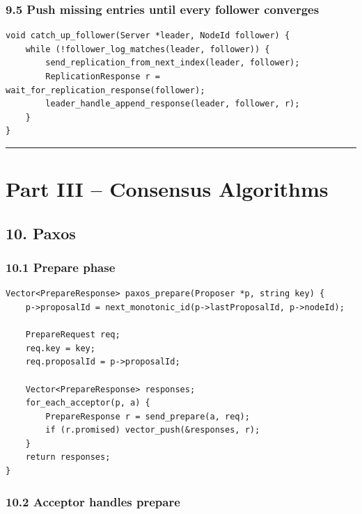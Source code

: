 \documentclass[10pt,letterpaper]{article}
\begin{document}
\subsubsection*{9.5 Push missing entries until every follower converges}

\begin{verbatim}
void catch_up_follower(Server *leader, NodeId follower) {
    while (!follower_log_matches(leader, follower)) {
        send_replication_from_next_index(leader, follower);
        ReplicationResponse r = wait_for_replication_response(follower);
        leader_handle_append_response(leader, follower, r);
    }
}
\end{verbatim}

\medskip\hrule\medskip

\clearpage
\section*{Part III -- Consensus Algorithms}

\subsection*{10. Paxos}

\subsubsection*{10.1 Prepare phase}

\begin{verbatim}
Vector<PrepareResponse> paxos_prepare(Proposer *p, string key) {
    p->proposalId = next_monotonic_id(p->lastProposalId, p->nodeId);

    PrepareRequest req;
    req.key = key;
    req.proposalId = p->proposalId;

    Vector<PrepareResponse> responses;
    for_each_acceptor(p, a) {
        PrepareResponse r = send_prepare(a, req);
        if (r.promised) vector_push(&responses, r);
    }
    return responses;
}
\end{verbatim}

\subsubsection*{10.2 Acceptor handles prepare}
\end{document}
